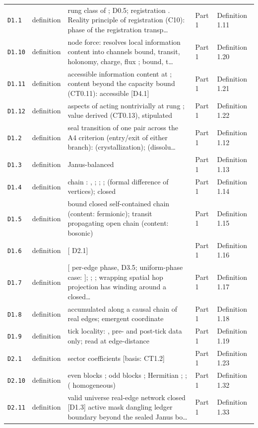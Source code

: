 \begin{longtable}{@{}p{}p{}p{}p{}p{}@{}}
\texttt{D1{.}1} & definition & rung class of ; D0.5; registration . Reality principle of registration (C10): phase of the registration transp… & Part 1 & Definition 1.11 \\
\texttt{D1{.}10} & definition & node force: resolves local information content into channels bound, transit, holonomy, charge, flux ; bound, t… & Part 1 & Definition 1.20 \\
\texttt{D1{.}11} & definition & accessible information content at ; content beyond the capacity bound (CT0.11): accessible [D4.1] & Part 1 & Definition 1.21 \\
\texttt{D1{.}12} & definition & aspects of acting nontrivially at rung ; value derived (CT0.13), stipulated & Part 1 & Definition 1.22 \\
\texttt{D1{.}2} & definition & seal transition of one pair across the A4 criterion (entry/exit of either branch): (crystallization); (dissolu… & Part 1 & Definition 1.12 \\
\texttt{D1{.}3} & definition & Janus-balanced & Part 1 & Definition 1.13 \\
\texttt{D1{.}4} & definition & chain : , ; ; ; (formal difference of vertices); closed & Part 1 & Definition 1.14 \\
\texttt{D1{.}5} & definition & bound closed self-contained chain (content: fermionic); transit propagating open chain (content: bosonic) & Part 1 & Definition 1.15 \\
\texttt{D1{.}6} & definition & [ D2.1] & Part 1 & Definition 1.16 \\
\texttt{D1{.}7} & definition & [ per-edge phase, D3.5; uniform-phase case: ]; ; ; wrapping spatial hop projection has winding around a closed… & Part 1 & Definition 1.17 \\
\texttt{D1{.}8} & definition & accumulated along a causal chain of real edges; emergent coordinate & Part 1 & Definition 1.18 \\
\texttt{D1{.}9} & definition & tick locality: , pre- and post-tick data only; read at edge-distance & Part 1 & Definition 1.19 \\
\texttt{D2{.}1} & definition & sector coefficients [basis: CT1.2] & Part 1 & Definition 1.23 \\
\texttt{D2{.}10} & definition & even blocks ; odd blocks ; Hermitian ; ; ( homogeneous) & Part 1 & Definition 1.32 \\
\texttt{D2{.}11} & definition & valid universe real-edge network closed [D1.3] active mask dangling ledger boundary beyond the sealed Janus bo… & Part 1 & Definition 1.33 \\

\end{longtable}
